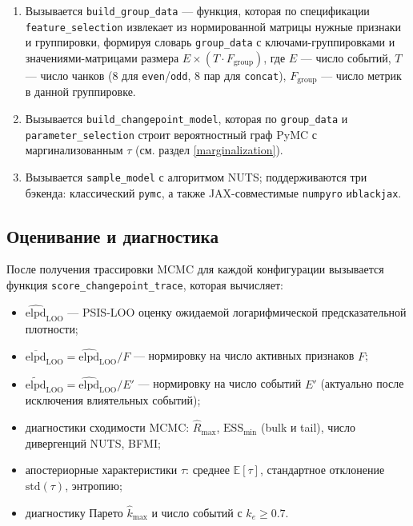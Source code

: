 \documentclass[14pt]{mmcs_article}
\begin{document}
	\begin{enumerate}
		\item Вызывается \texttt{build\_group\_data} — функция,
		которая по спецификации \texttt{feature\_selection}
		извлекает из нормированной матрицы нужные признаки
		и группировки, формируя словарь
		\texttt{group\_data} с \linebreak ключами-группировками и
		значениями-матрицами размера\linebreak
		$E \times (T \cdot F_{\text{group}})$, где $E$ —
		число событий, $T$ — число чанков (8 для
		\texttt{even}/\texttt{odd}, 8 пар для
		\texttt{concat}), $F_{\text{group}}$ — число
		метрик в данной группировке.
		\item Вызывается \texttt{build\_changepoint\_model},
		которая по \texttt{group\_data} и \linebreak
		\texttt{parameter\_selection} строит вероятностный
		граф PyMC с маргинализованным $\tau$ (см. раздел
		\ref{marginalization}).
		\item Вызывается \texttt{sample\_model} с алгоритмом
		NUTS; поддерживаются три бэкенда: классический
		\texttt{pymc}, а также JAX-совместимые
		\texttt{numpyro} и\linebreak \texttt{blackjax}.
	\end{enumerate}
	
	
	
	\subsection*{Оценивание и диагностика}
	
	После получения трассировки MCMC для каждой конфигурации
	вызывается функция \texttt{score\_changepoint\_trace},
	которая вычисляет:
	
	\begin{itemize}
		\item $\widehat{\mathrm{elpd}}_{\mathrm{LOO}}$ —
		PSIS-LOO оценку ожидаемой логарифмической
		предсказательной плотности;
		\item $\overline{\mathrm{elpd}}_{\mathrm{LOO}} =
		\widehat{\mathrm{elpd}}_{\mathrm{LOO}} / F$ —
		нормировку на число активных признаков $F$;
		\item $\widetilde{\mathrm{elpd}}_{\mathrm{LOO}} =
		\widehat{\mathrm{elpd}}_{\mathrm{LOO}} / E'$ —
		нормировку на число событий $E'$ (актуально после
		исключения влиятельных событий);
		\item диагностики сходимости MCMC: $\hat{R}_{\max}$,
		$\mathrm{ESS}_{\min}$ (bulk и tail), число
		дивергенций NUTS, BFMI;
		\item апостериорные характеристики $\tau$: среднее
		$\mathbb{E}[\tau]$, стандартное отклонение
		$\mathrm{std}(\tau)$, энтропию;
		\item диагностику Парето $\hat{k}_{\max}$ и число событий
		с $\hat{k}_e \geq 0.7$.
	\end{itemize}
	
\end{document}
